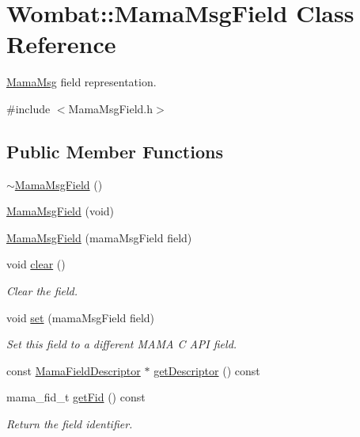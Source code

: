 \hypertarget{classWombat_1_1MamaMsgField}{
\section{Wombat::MamaMsgField Class Reference}
\label{classWombat_1_1MamaMsgField}
}


\hyperlink{classWombat_1_1MamaMsg}{MamaMsg} field representation.  


{\ttfamily \#include $<$MamaMsgField.h$>$}\subsection*{Public Member Functions}
\begin{DoxyCompactItemize}
\item 
\hyperlink{classWombat_1_1MamaMsgField_a97ac3b0c0677a4b744523af7606f4cdd}{$\sim$MamaMsgField} ()
\item 
\hyperlink{classWombat_1_1MamaMsgField_a39f4e2d29d9938b38ed02e02ac8f1a40}{MamaMsgField} (void)
\item 
\hyperlink{classWombat_1_1MamaMsgField_aa20d786a608ee1174855db1b21a8f614}{MamaMsgField} (mamaMsgField field)
\item 
void \hyperlink{classWombat_1_1MamaMsgField_a30bae12984e55846dd76bd63e8d273ab}{clear} ()
\begin{DoxyCompactList}\small\item\em Clear the field. \item\end{DoxyCompactList}\item 
void \hyperlink{classWombat_1_1MamaMsgField_ac8dfdbb37065c064a08bf1193328d692}{set} (mamaMsgField field)
\begin{DoxyCompactList}\small\item\em Set this field to a different MAMA C API field. \item\end{DoxyCompactList}\item 
const \hyperlink{classWombat_1_1MamaFieldDescriptor}{MamaFieldDescriptor} $\ast$ \hyperlink{classWombat_1_1MamaMsgField_a12e62353f1d39d655a1e004218351963}{getDescriptor} () const 
\item 
mama\_\-fid\_\-t \hyperlink{classWombat_1_1MamaMsgField_a998420c9fc3f7fa20ec55cb57134c3df}{getFid} () const 
\begin{DoxyCompactList}\small\item\em Return the field identifier. \item\end{DoxyCompactList}\item 

\end{DoxyCompactItemize}
